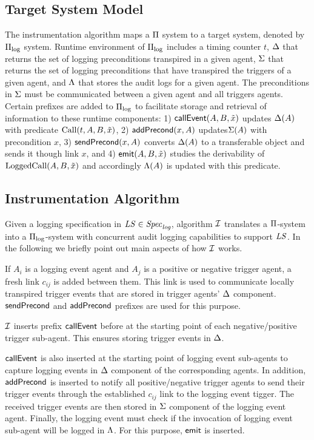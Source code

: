 \subsection{Target System Model} \label{sec:pi-log}
The instrumentation algorithm maps a $\Pi$ system to a target system, denoted by $\Pi_{\mathrm{log}}$ system. Runtime environment of $\Pi_{\mathrm{log}}$ includes a timing counter $t$, $\Delta$ that returns the set of logging preconditions transpired in a given agent, $\Sigma$ that returns the set of logging preconditions that have transpired the triggers of a given agent, and $\Lambda$ that stores the audit logs for a given agent. The preconditions in $\Sigma$ must be communicated between a given agent and all triggers agents. Certain prefixes are added to $\Pi_{\mathrm{log}}$ to facilitate storage and retrieval of information to these runtime components: 1) $\mathsf{callEvent}(A,B,\tilde{x})$ updates $\Delta(A)$ with predicate $\mathrm{Call}(t,A,B,\tilde{x})$, 2) $\mathsf{addPrecond}(x,A)$ updates$\Sigma(A)$ with precondition $x$, 3) $\mathsf{sendPrecond}(x,A)$ converts $\Delta(A)$ to a transferable object and sends it though link $x$, and 4) $\mathsf{emit}(A,B,\tilde{x})$ studies the derivability of $\mathrm{LoggedCall}(A,B,\tilde{x})$ and accordingly $\Lambda(A)$ is updated with this predicate. 


\subsection{Instrumentation Algorithm} \label{sec:inst-alg}
Given a logging specification in $\mathit{LS} \in {\mathit{Spec}_{\mathit{log}}}$, algorithm $\mathcal{I}$ translates a $\Pi$-system into a $\Pi_{\mathrm{log}}$-system with concurrent audit logging capabilities to support $\mathit{LS}$. In the following we briefly point out main aspects of how $\mathcal{I}$ works. 

If $A_i$ is a logging event agent and $A_j$ is a positive or negative trigger agent, a fresh link $c_{ij}$ is added between them. This link is used to communicate locally transpired trigger events that are stored in trigger agents' $\Delta$ component. $\mathsf{sendPrecond}$ and $\mathsf{addPrecond}$ prefixes are used for this purpose.

$\mathcal{I}$ inserts prefix $\mathsf{callEvent}$ before at the starting point of each negative/positive trigger sub-agent. This ensures storing trigger events in $\Delta$. 

$\mathsf{callEvent}$  is also inserted at the starting point of logging event sub-agents to capture logging events in $\Delta$ component of the corresponding agents. In addition, $\mathsf{addPrecond}$ is inserted to notify all positive/negative trigger agents to send their trigger events through the established $c_{ij}$ link to the logging event tigger. The received trigger events are then stored in $\Sigma$ component of the logging event agent. Finally, the logging event must check if the invocation of logging event sub-agent will be logged in $\Lambda$. For this purpose, $\mathsf{emit}$ is inserted.

